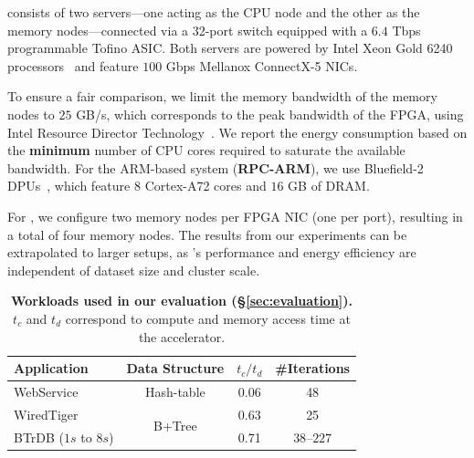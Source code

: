  consists of two servers—one acting as the CPU node and the other as the memory nodes—connected via a 32-port switch equipped with a $6.4$ Tbps programmable Tofino ASIC. Both servers are powered by Intel Xeon Gold 6240 processors~\cite{intelprocessor} and feature $100$ Gbps Mellanox ConnectX-5 NICs. 

To ensure a fair comparison, we limit the memory bandwidth of the memory nodes to $25$ GB/s, which corresponds to the peak bandwidth of the FPGA, using Intel Resource Director Technology~\cite{intel_cmt_cat}. We report the energy consumption based on the \textbf{minimum} number of CPU cores required to saturate the available bandwidth. For the ARM-based system (\textbf{RPC-ARM}), we use Bluefield-2 DPUs~\cite{bluefield}, which feature $8$ Cortex-A72 cores and $16$ GB of DRAM. 

For \pulse, we configure two memory nodes per FPGA NIC (one per port), resulting in a total of four memory nodes. The results from our experiments can be extrapolated to larger setups, as \pulse's performance and energy efficiency are independent of dataset size and cluster scale.


\begin{table}[!t]
  \centering
  \bgroup
  \small
  \def\arraystretch{0.95}%
  \begin{tabular}{l|c|c|c} 
        \hline
        \textbf{Application} & \textbf{Data Structure} & \textbf{$t_c/t_d$} & \textbf{\#Iterations} \\\hline\hline
        WebService & Hash-table & 0.06 & 48 \\\hline
        WiredTiger & \multirow{2}{*}{B+Tree} & 0.63 & 25 \\\cline{1-1}\cline{3-4}
        BTrDB ($1s$ to $8s$) & & 0.71 & $38$--$227$ \\\hline
  \end{tabular}
  \egroup
  \caption[Workloads used in our evaluation]{\textbf{Workloads used in our evaluation (\S\ref{sec:evaluation}).} $t_c$ and $t_d$ correspond to compute and memory access time at the \pulse accelerator.} 
  \label{tab:workloads}
\end{table}

